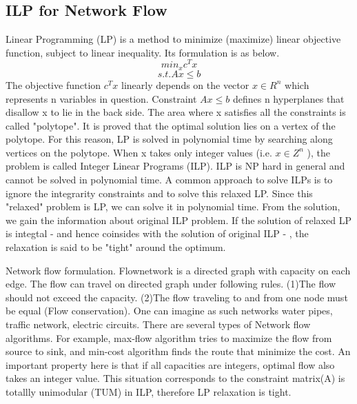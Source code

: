 \documentclass[10pt,twocolumn,letterpaper]{article}
\begin{document}
\subsection{ILP for Network Flow}
\label{ILP formulation}
Linear Programming (LP) is a method to minimize (maximize) linear objective function, subject to linear inequality. Its formulation is as below.
\[
min_{x} 　c^{T}x
\]
\[
s.t. Ax \leq b
\]
The objective function \(c^{T}x\) linearly depends on the vector \(x \in R^{n}\) which represents n variables in question. Constraint \(Ax \leq b\) defines n hyperplanes that disallow x to lie in the back side. The area where x satisfies all the constraints is called "polytope". It is proved that the optimal solution lies on a vertex of the polytope. For this reason, LP is solved in polynomial time by searching along vertices on the polytope.
When x takes only integer values (i.e. \(x \in Z^{n}\) ), the problem is called Integer Linear Programs (ILP). ILP is NP hard in general and cannot be solved in polynomial time. 
A common approach to solve ILPs is to ignore the integrarity constraints and to solve this relaxed LP. Since this "relaxed" problem is LP, we can solve it in polynomial time. From the solution, we gain the information about original ILP problem.
If the solution of relaxed LP is integtal - and hence coinsides with the solution of original ILP - , the relaxation is said to be "tight" around the optimum.


Network flow formulation.
Flownetwork is a directed graph with capacity on each edge. The flow can travel on directed graph under following rules. (1)The flow should not exceed the capacity. (2)The flow traveling to and from one node must be equal (Flow conservation). One can imagine as such networks water pipes, traffic network, electric circuits. There are several types of Network flow algorithms. For example, max-flow algorithm tries to maximize the flow from source to sink, and min-cost algorithm finds the route that minimize the cost. An important property here is that if all capacities are integers, optimal flow also takes an integer value. This situation corresponds to the constraint matrix(A) is totallly unimodular (TUM) in ILP, therefore LP relaxation is tight.
\end{document}

